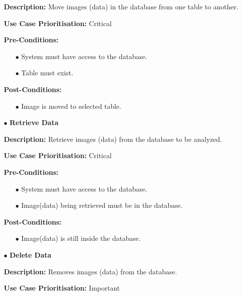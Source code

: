 \documentclass[a4paper,12pt]{report}
\begin{document}
\begin{itemize}
		\textbf{Description:} Move images (data) in the database from one table to another.\newline
		
		\textbf{Use Case Prioritisation:} Critical\newline

		\textbf{Pre-Conditions:}
		\begin{itemize}
			\item[$\bullet$]System must have access to the database.
			\item[$\bullet$]Table must exist.
			\\
		\end{itemize}
		\textbf{Post-Conditions: }
		\begin{itemize}
			\item[$\bullet$]Image is moved to selected table.
			\\
		\end{itemize}
		\item[$\bullet$]\textbf{Retrieve Data}\newline

		\textbf{Description:} Retrieve images (data) from the database to be analyzed.\newline
		
		\textbf{Use Case Prioritisation:} Critical\newline

		\textbf{Pre-Conditions:}
		\begin{itemize}
			\item[$\bullet$]System must have access to the database.
			\item[$\bullet$]Image(data) being retrieved must be in the database.
			\\
		\end{itemize}
		\textbf{Post-Conditions: }
		\begin{itemize}
			\item[$\bullet$]Image(data) is still inside the database.
			\\
		\end{itemize}
		\newpage
		\item[$\bullet$]\textbf{Delete Data}\newline

		\textbf{Description:} Removes images (data) from the database.\newline
		
		\textbf{Use Case Prioritisation:} Important\newline


\end{itemize}
\end{document}
